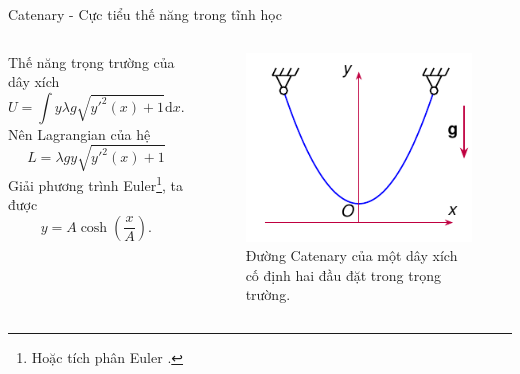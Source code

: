 \begin{frame}{Catenary - Cực tiểu thế năng trong tĩnh học}
\begin{columns}
    Thế năng trọng trường của dây xích
    \begin{equation}
        U = \int y \lambda g \sqrt{ y'^2(x) + 1} \mathrm{d} x.
    \end{equation}
    Nên Lagrangian của hệ
    \begin{equation}
        L = \lambda g y \sqrt{ y'^2(x) + 1}
    \end{equation}
    Giải phương trình Euler\footnote{Hoặc tích phân Euler \cite{cline2017variational}.}, ta được
    \begin{equation}
        y = A \cosh \left( \frac{x}{A} \right).
    \end{equation}
    
    \vspace{-5mm}
    \begin{figure}
        \centering
        \includegraphics[width=0.9\linewidth]{Figures/Catenary.pdf}
        \caption{Đường Catenary của một dây xích cố định hai đầu đặt trong trọng trường.}
        \label{fig:Catenary}
    \end{figure}
\end{columns}
\end{frame}


